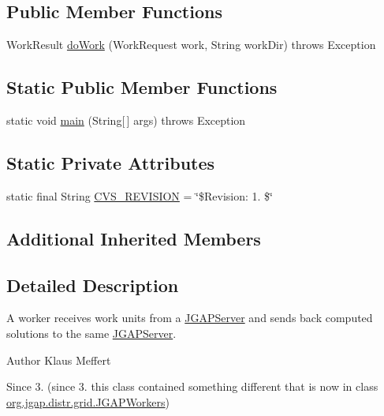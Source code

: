 \subsection*{Public Member Functions}
\begin{DoxyCompactItemize}
\item 
Work\-Result \hyperlink{classorg_1_1jgap_1_1distr_1_1grid_1_1_j_g_a_p_worker_ae03c268f54333b88162959811590558d}{do\-Work} (Work\-Request work, String work\-Dir)  throws Exception 
\end{DoxyCompactItemize}
\subsection*{Static Public Member Functions}
\begin{DoxyCompactItemize}
\item 
static void \hyperlink{classorg_1_1jgap_1_1distr_1_1grid_1_1_j_g_a_p_worker_a88201dc16656042f2156a0c298743021}{main} (String\mbox{[}$\,$\mbox{]} args)  throws Exception 
\end{DoxyCompactItemize}
\subsection*{Static Private Attributes}
\begin{DoxyCompactItemize}
\item 
static final String \hyperlink{classorg_1_1jgap_1_1distr_1_1grid_1_1_j_g_a_p_worker_a9d0a0879ef16cc99b608329d09b5c1fb}{C\-V\-S\-\_\-\-R\-E\-V\-I\-S\-I\-O\-N} = \char`\"{}\$Revision\-: 1. \$\char`\"{}
\end{DoxyCompactItemize}
\subsection*{Additional Inherited Members}


\subsection{Detailed Description}
A worker receives work units from a \hyperlink{classorg_1_1jgap_1_1distr_1_1grid_1_1_j_g_a_p_server}{J\-G\-A\-P\-Server} and sends back computed solutions to the same \hyperlink{classorg_1_1jgap_1_1distr_1_1grid_1_1_j_g_a_p_server}{J\-G\-A\-P\-Server}.

\begin{DoxyAuthor}{Author}
Klaus Meffert 
\end{DoxyAuthor}
\begin{DoxySince}{Since}
3. (since 3. this class contained something different that is now in class \hyperlink{classorg_1_1jgap_1_1distr_1_1grid_1_1_j_g_a_p_workers}{org.\-jgap.\-distr.\-grid.\-J\-G\-A\-P\-Workers}) 
\end{DoxySince}


